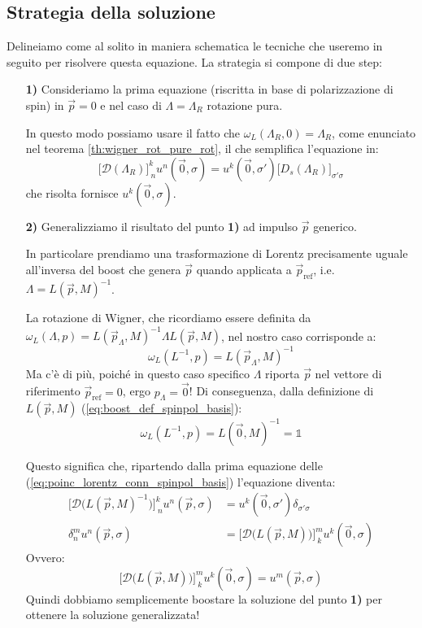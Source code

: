 \documentclass[../main.tex]{subfiles}
\begin{document}
\subsection{Strategia della soluzione}
Delineiamo come al solito in maniera schematica le tecniche che useremo in seguito per risolvere questa equazione. La strategia si compone di due step:
\begin{enumerate}
    \item[\textbf{1)}] Consideriamo la prima equazione (riscritta in base di polarizzazione di spin) in $\Vec{p}=0$ e nel caso di $\Lambda = \Lambda_R$ rotazione pura.

    In questo modo possiamo usare il fatto che $\omega_L(\Lambda_R,0) = \Lambda_R$, come enunciato nel teorema \ref{th:wigner_rot_pure_rot}, il che semplifica l'equazione in:
    \begin{equation}
        \boxed{\big[\mathscr D(\Lambda_R)\big]^k_{~n}u^n(\Vec{0},\sigma)= u^k(\Vec{0},\sigma')\big[D_s(\Lambda_R)\big]_{\sigma'\sigma} }
        \label{eq:PL_conn_step1}
    \end{equation}
    che risolta fornisce $u^k(\Vec{0},\sigma)$.
    
    \item[\textbf{2)}] Generalizziamo il risultato del punto \textbf{1)} ad impulso $\Vec{p}$ generico.

    In particolare prendiamo una trasformazione di Lorentz precisamente uguale all'inversa del boost che genera $\Vec{p}$ quando applicata a $\Vec{p}_\text{ref}$, i.e. \(\Lambda = L(\Vec{p},M)^{-1}\).

    La rotazione di Wigner, che ricordiamo essere definita da
    \(\omega_L(\Lambda,p) = L(\Vec{p}_\Lambda,M)^{-1} \Lambda L(\Vec{p},M) \), nel nostro caso corrisponde a:
    \[
    \omega_L(L^{-1},p) = L(\Vec{p}_\Lambda,M)^{-1}
    \]
    Ma c'è di più, poiché in questo caso specifico $\Lambda$ riporta $\Vec{p}$ nel vettore di riferimento $\Vec{p}_\text{ref} =0$, ergo $p_\Lambda = \Vec{0}$! Di conseguenza, dalla definizione di $L(\Vec{p},M)$ (\ref{eq:boost_def_spinpol_basis}):
    \[
    \omega_L(L^{-1},p) = L(\Vec{0},M)^{-1} = \mathbb 1
    \]

    Questo significa che, ripartendo dalla prima equazione delle (\ref{eq:poinc_lorentz_conn_spinpol_basis}) l'equazione diventa:
    \begin{align*}
        \big[\mathscr D\big(L(\Vec{p},M)^{-1}\big)\big]^k_{~n}u^n(\Vec{p},\sigma)&= u^k(\Vec{0},\sigma')\delta_{\sigma'\sigma} \\
        \delta^m_n u^n(\Vec{p},\sigma)&= \big[\mathscr D\big(L(\Vec{p},M)\big)\big]^m_{~k}u^k(\Vec{0},\sigma)
    \end{align*}
    Ovvero:
    \begin{equation}
        \boxed{\big[\mathscr D\big(L(\Vec{p},M)\big)\big]^m_{~k}u^k(\Vec{0},\sigma) = u^m(\Vec{p},\sigma)}
        \label{eq:PL_conn_step2}
    \end{equation}
    Quindi dobbiamo semplicemente boostare la soluzione del punto \textbf{1)} per ottenere la soluzione generalizzata!
\end{enumerate}
\end{document}
